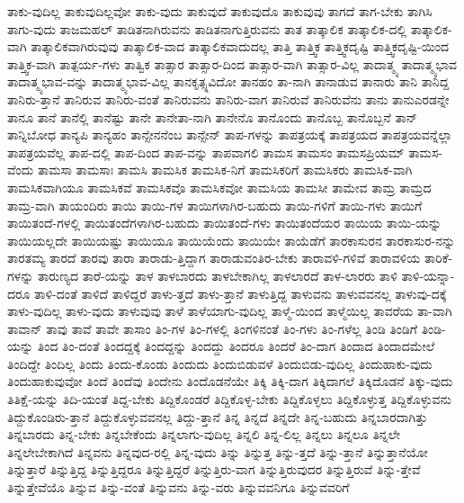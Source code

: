 {ತಾಕು-ವುದಿಲ್ಲ
ತಾಕುವುದಿಲ್ಲವೋ
ತಾಕು-ವುದು
ತಾಕುವುದೆ
ತಾಕುವುದೊ
ತಾಕುವುವು
ತಾಗದೆ
ತಾಗ-ಬೇಕು
ತಾಗಿಸಿ
ತಾಗು-ವುದು
ತಾಜಮಹಲ್
ತಾಡಿತನಾಗಿರುವನು
ತಾಡಿತನಾಗುತ್ತಿರುವನು
ತಾತ
ತಾತ್ಕಾಲಿಕ
ತಾತ್ಕಾಲಿಕ-ದಲ್ಲಿ
ತಾತ್ಕಾಲಿಕ-ವಾಗಿ
ತಾತ್ಕಾಲಿಕವಾಗಿರುವುವು
ತಾತ್ಕಾಲಿಕ-ವಾದ
ತಾತ್ಕಾಲಿಕವಾದುದಲ್ಲ
ತಾತ್ತಿ
ತಾತ್ತ್ವಿಕ
ತಾತ್ತ್ವಿಕದೃಷ್ಟಿ
ತಾತ್ತ್ವಿಕದೃಷ್ಟಿ-ಯಿಂದ
ತಾತ್ತ್ವಿಕ-ವಾಗಿ
ತಾತ್ಪರ್ಯ-ಗಳು
ತಾತ್ವಿಕ
ತಾತ್ಸಾರ
ತಾತ್ಸಾರ-ದಿಂದ
ತಾತ್ಸಾರ-ವಾಗಿ
ತಾತ್ಸಾರ-ವಿಲ್ಲ
ತಾದಾತ್ಮ್ಯ
ತಾದಾತ್ಮ್ಯಭಾವ
ತಾದಾತ್ಮ್ಯಭಾವ-ವನ್ನು
ತಾದಾತ್ಮ್ಯಭಾವ-ವಿಲ್ಲ
ತಾನಕೃತ್ಸ್ನವಿದೋ
ತಾನಹಂ
ತಾ-ನಾಗಿ
ತಾನಾಡುವ
ತಾನಾರು
ತಾನಿ
ತಾನಿದ್ದ
ತಾನಿರು-ತ್ತಾನೆ
ತಾನಿರುವ
ತಾನಿರು-ವಂತೆ
ತಾನಿರುವನು
ತಾನಿರು-ವಾಗ
ತಾನಿರುವೆ
ತಾನಿರುವೆನು
ತಾನು
ತಾನುಎರಡನ್ನೇ
ತಾನೂ
ತಾನೆ
ತಾನೆಲ್ಲಿ
ತಾನೆಷ್ಟು
ತಾನೇ
ತಾನೇತಾ-ನಾಗಿ
ತಾನೇನೊ
ತಾನೊಂದು
ತಾನೊಬ್ಬ
ತಾನೊಬ್ಬನೆ
ತಾನ್
ತಾನ್ನಿಬೋಧ
ತಾನ್ಯಪಿ
ತಾನ್ಯಹಂ
ತಾನ್ಸೇನನೆಂಬ
ತಾನ್ಸೇನ್
ತಾಪ-ಗಳನ್ನು
ತಾಪತ್ರಯಕ್ಕೆ
ತಾಪತ್ರಯದ
ತಾಪತ್ರಯವನ್ನೆಲ್ಲಾ
ತಾಪತ್ರಯವೆಲ್ಲ
ತಾಪ-ದಲ್ಲಿ
ತಾಪ-ದಿಂದ
ತಾಪ-ವನ್ನು
ತಾಪವಾಗಲಿ
ತಾಮಸ
ತಾಮಸಂ
ತಾಮಸಪ್ರಿಯಮ್
ತಾಮಸ-ವೆಂದು
ತಾಮಸಾ
ತಾಮಸಾಃ
ತಾಮಸಿ
ತಾಮಸಿಕ
ತಾಮಸಿಕ-ನಿಗೆ
ತಾಮಸಿಕರಿಗೆ
ತಾಮಸಿಕರು
ತಾಮಸಿಕ-ವಾಗಿ
ತಾಮಸಿಕವಾಗಿಯೂ
ತಾಮಸಿಕವೆ
ತಾಮಸಿಕವೊ
ತಾಮಸಿಕವೋ
ತಾಮಸಿಯ
ತಾಮಸೀ
ತಾಮೇವ
ತಾಮ್ರ
ತಾಮ್ರದ
ತಾಮ್ರ-ವಾಗಿ
ತಾಯಂದಿರು
ತಾಯಿ
ತಾಯಿ-ಗಳ
ತಾಯಿಗಳಾಗಿರ-ಬಹುದು
ತಾಯಿ-ಗಳಿಗೆ
ತಾಯಿ-ಗಳು
ತಾಯಿಗೆ
ತಾಯಿತಂದೆ-ಗಳಲ್ಲಿ
ತಾಯಿತಂದೆಗಳಾಗಿರ-ಬಹುದು
ತಾಯಿತಂದೆ-ಗಳು
ತಾಯಿತಂದೆಯರ
ತಾಯಿಯ
ತಾಯಿ-ಯನ್ನು
ತಾಯಿಯಲ್ಲದೇ
ತಾಯಿಯಷ್ಟು
ತಾಯಿಯೂ
ತಾಯಿಯೆಂದು
ತಾಯಿಯೇ
ತಾಯೆಡೆಗೆ
ತಾರಕಾಸುರನ
ತಾರಕಾಸುರ-ನನ್ನು
ತಾರತಮ್ಯ
ತಾರದೆ
ತಾರವು
ತಾರಾ
ತಾರಾಡು-ತ್ತಿದ್ದಾಗ
ತಾರಾಡುವಂತಿರ-ಬೇಕು
ತಾರಾವಳಿ-ಗಳಿವೆ
ತಾರಾವಳಿಯ
ತಾರಿಕೆ-ಗಳನ್ನು
ತಾರುಣ್ಯದ
ತಾರೆ-ಯನ್ನು
ತಾಳ
ತಾಳಬಾರದು
ತಾಳಬೇಕಾಗಿಲ್ಲ
ತಾಳಲಾರದೆ
ತಾಳ-ಲಾರರು
ತಾಳಿ
ತಾಳಿ-ಯನ್ನಾ-ದರೂ
ತಾಳಿ-ದಂತೆ
ತಾಳಿದೆ
ತಾಳಿದ್ದರೆ
ತಾಳು-ತ್ತದೆ
ತಾಳು-ತ್ತಾನೆ
ತಾಳುತ್ತಿದ್ದ
ತಾಳುವನು
ತಾಳುವವನಲ್ಲ
ತಾಳುವು-ದಕ್ಕೆ
ತಾಳು-ವುದಿಲ್ಲ
ತಾಳು-ವುದು
ತಾಳುವುವು
ತಾಳೆ
ತಾಳೆಯಾಗು-ವುದಿಲ್ಲ
ತಾಳ್ಮೆ-ಯಿಂದ
ತಾಳ್ಮೆಯಿಲ್ಲ
ತಾವರೆಯ
ತಾ-ವಾಗಿ
ತಾವಾನ್
ತಾವು
ತಾವೆ
ತಾವೇ
ತಾಸಾಂ
ತಿಂ-ಗಳ
ತಿಂ-ಗಳಲ್ಲಿ
ತಿಂಗಳಿನಂತೆ
ತಿಂ-ಗಳು
ತಿಂ-ಗಳೆಲ್ಲ
ತಿಂಡಿ
ತಿಂಡಿಗೆ
ತಿಂಡಿ-ಯನ್ನು
ತಿಂದ
ತಿಂ-ದಂತೆ
ತಿಂದದ್ದಕ್ಕೆ
ತಿಂದದ್ದನ್ನು
ತಿಂದದ್ದು
ತಿಂದರೂ
ತಿಂದರೆ
ತಿಂ-ದಾಗ
ತಿಂದಾದ
ತಿಂದಾದಮೇಲೆ
ತಿಂದಿದ್ದೇ
ತಿಂದಿಲ್ಲ
ತಿಂದು
ತಿಂದು-ಕೊಂಡು
ತಿಂದುದು
ತಿಂದುಬಿಡುವಳೆ
ತಿಂದುಬಿಡು-ವುದಿಲ್ಲ
ತಿಂದುಹಾಕು-ವುದು
ತಿಂದುಹಾಕುವುವೋ
ತಿಂದೆ
ತಿಂದೆವು
ತಿಂದೇನು
ತಿಂದೊಡನೆಯೇ
ತಿಕ್ಕಿ
ತಿಕ್ಕಿ-ದಾಗ
ತಿಕ್ಕಿದಾಗಲೆ
ತಿಕ್ಕಿದೊಡನೆ
ತಿಕ್ಕು-ವುದು
ತಿತಿಕ್ಷೆ-ಯನ್ನು
ತಿದಿ-ಯಂತೆ
ತಿದ್ದ-ಬೇಕು
ತಿದ್ದಿಕೊಂಡರೆ
ತಿದ್ದಿಕೊಳ್ಳ-ಬೇಕು
ತಿದ್ದಿಕೊಳ್ಳಲು
ತಿದ್ದಿಕೊಳ್ಳುತ್ತ
ತಿದ್ದಿಕೊಳ್ಳುವನು
ತಿದ್ದುಕೊಂಡಿರು-ತ್ತಾನೆ
ತಿದ್ದುಕೊಳ್ಳುವವನಲ್ಲ
ತಿದ್ದು-ತ್ತಾನೆ
ತಿನ್ನ
ತಿನ್ನದೆ
ತಿನ್ನದೇ
ತಿನ್ನ-ಬಹುದು
ತಿನ್ನಬಾರದಾಗಿತ್ತು
ತಿನ್ನಬಾರದು
ತಿನ್ನ-ಬೇಕು
ತಿನ್ನಬೇಕೆಂದು
ತಿನ್ನಲಾಗು-ವುದಿಲ್ಲ
ತಿನ್ನಲಿ
ತಿನ್ನ-ಲಿಲ್ಲ
ತಿನ್ನಲು
ತಿನ್ನಲೂ
ತಿನ್ನಲೇ
ತಿನ್ನಲೇಬೇಕಾಗಿದೆ
ತಿನ್ನವನು
ತಿನ್ನವುದ-ರಲ್ಲಿ
ತಿನ್ನ-ವುದು
ತಿನ್ನು
ತಿನ್ನುತ್ತ
ತಿನ್ನು-ತ್ತದೆ
ತಿನ್ನು-ತ್ತಾನೆ
ತಿನ್ನುತ್ತಾನೆಯೋ
ತಿನ್ನುತ್ತಾರೆ
ತಿನ್ನುತ್ತಿದ್ದ
ತಿನ್ನುತ್ತಿದ್ದರೂ
ತಿನ್ನುತ್ತಿದ್ದರೆ
ತಿನ್ನುತ್ತಿರು-ವಾಗ
ತಿನ್ನುತ್ತಿರುವುದರ
ತಿನ್ನುತ್ತಿರುವೆ
ತಿನ್ನು-ತ್ತೇವೆ
ತಿನ್ನುತ್ತೇವೆಯೊ
ತಿನ್ನುವ
ತಿನ್ನು-ವಂತೆ
ತಿನ್ನುವನು
ತಿನ್ನು-ವರು
ತಿನ್ನುವವನಿಗೂ
ತಿನ್ನುವವರಿಗೆ
}
